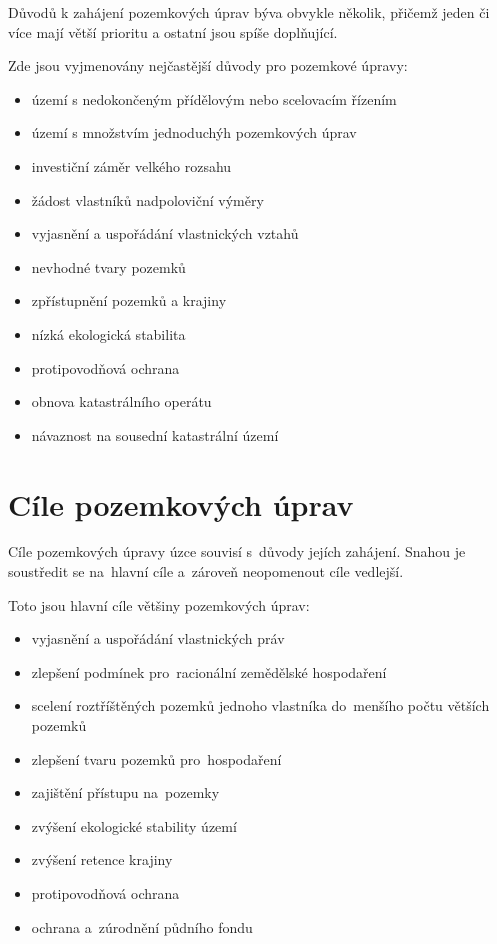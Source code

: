 Důvodů k zahájení pozemkových úprav býva obvykle několik, přičemž jeden či více mají větší prioritu a ostatní jsou spíše doplňující.

Zde jsou vyjmenovány nejčastější důvody pro pozemkové úpravy:
	\begin{itemize}[noitemsep, leftmargin=1.5cm]
		\item území s nedokončeným přídělovým nebo scelovacím řízením
		\item území s množstvím jednoduchýh pozemkových úprav
		\item investiční záměr velkého rozsahu
		\item žádost vlastníků nadpoloviční výměry
		\item vyjasnění a uspořádání vlastnických vztahů
		\item nevhodné tvary pozemků
		\item zpřístupnění pozemků a krajiny
		\item nízká ekologická stabilita
		\item protipovodňová ochrana
		\item obnova katastrálního operátu
		\item návaznost na sousední katastrální území
	\end{itemize}

\section{Cíle pozemkových úprav}
\label{cile_pu}

Cíle pozemkových úpravy úzce souvisí s~důvody jejích zahájení. Snahou je soustředit se na~hlavní cíle a~zároveň neopomenout cíle vedlejší.

Toto jsou hlavní cíle většiny pozemkových úprav:
	\begin{itemize}[noitemsep, leftmargin=1.5cm]
		\item vyjasnění a uspořádání vlastnických práv
		\item zlepšení podmínek pro~racionální zemědělské hospodaření
		\item scelení roztříštěných pozemků jednoho vlastníka do~menšího počtu větších pozemků
		\item zlepšení tvaru pozemků pro~hospodaření
		\item zajištění přístupu na~pozemky
		\item zvýšení ekologické stability území
		\item zvýšení retence krajiny
		\item protipovodňová ochrana
		\item ochrana a~zúrodnění půdního fondu
	\end{itemize}


